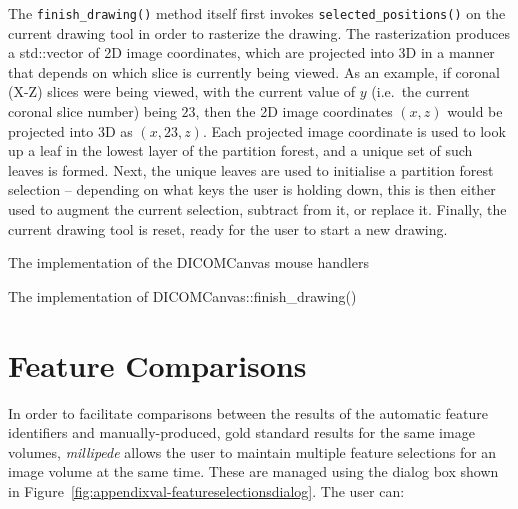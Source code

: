 The \texttt{finish_drawing()} method itself first invokes \texttt{selected_positions()} on the current drawing tool in order to rasterize the drawing. The rasterization produces a std::vector of 2D image coordinates, which are projected into 3D in a manner that depends on which slice is currently being viewed. As an example, if coronal (X-Z) slices were being viewed, with the current value of $y$ (i.e.~the current coronal slice number) being $23$, then the 2D image coordinates $(x,z)$ would be projected into 3D as $(x,23,z)$. Each projected image coordinate is used to look up a leaf in the lowest layer of the partition forest, and a unique set of such leaves is formed. Next, the unique leaves are used to initialise a partition forest selection -- depending on what keys the user is holding down, this is then either used to augment the current selection, subtract from it, or replace it. Finally, the current drawing tool is reset, ready for the user to start a new drawing.

\begin{stulisting}[p]
\caption{The implementation of the DICOMCanvas mouse handlers}
\label{code:appendixval-mousehandlers}

\end{stulisting}

\begin{stulisting}[p]
\caption{The implementation of DICOMCanvas::finish_drawing()}
\label{code:appendixval-finishdrawing}

\end{stulisting}

\newpage

\section{Feature Comparisons}
\label{sec:appendixval-featurecomparisons}

In order to facilitate comparisons between the results of the automatic feature identifiers and manually-produced, gold standard results for the same image volumes, \emph{millipede} allows the user to maintain multiple feature selections for an image volume at the same time. These are managed using the dialog box shown in Figure~\ref{fig:appendixval-featureselectionsdialog}. The user can:

